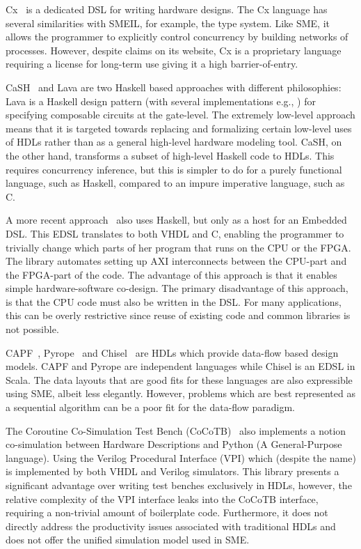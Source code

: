 Cx~\cite{cxlang} is a dedicated DSL for writing hardware designs. The Cx
language has several similarities with SMEIL, for example, the type system. Like
SME, it allows the programmer to explicitly control concurrency by building
networks of processes. However, despite claims on its website, Cx is a
proprietary language requiring a license for long-term use giving it a high
barrier-of-entry.

C\textlambda{}aSH~\cite{wester2015transformation} and Lava\cite{bjesse1998lava}
are two Haskell based approaches with different philosophies: Lava is a Haskell
design pattern (with several implementations e.g., \cite{gill2009introducing})
for specifying composable circuits at the gate-level. The extremely low-level
approach means that it is targeted towards replacing and formalizing certain
low-level uses of HDLs rather than as a general high-level hardware modeling
tool. C\textlambda{}aSH, on the other hand, transforms a subset of high-level
Haskell code to HDLs. This requires concurrency inference, but this is simpler
to do for a purely functional language, such as Haskell, compared to an impure
imperative language, such as C.

A more recent approach~\cite{aronsson2017hardware} also uses Haskell, but only
as a host for an Embedded DSL. This EDSL translates to both VHDL and C, enabling
the programmer to trivially change which parts of her program that runs on the
CPU or the FPGA. The library automates setting up AXI interconnects between the
CPU-part and the FPGA-part of the code. The advantage of this approach is that
it enables simple hardware-software co-design. The primary disadvantage of this
approach, is that the CPU code must also be written in the DSL. For many
applications, this can be overly restrictive since reuse of existing code and
common libraries is not possible.

CAPF~\cite{serot2011implementing}, Pyrope~\cite{pyrope} and
Chisel~\cite{bachrach2012chisel} are HDLs which provide data-flow based design
models. CAPF and Pyrope are independent languages while Chisel is an EDSL in
Scala. The data layouts that are good fits for these languages are also
expressible using SME, albeit less elegantly. However, problems which are best
represented as a sequential algorithm can be a poor fit for the data-flow
paradigm.

The Coroutine Co-Simulation Test Bench (CoCoTB)~\cite{cocotb} also implements a
notion co-simulation between Hardware Descriptions and Python (A General-Purpose
language). Using the Verilog Procedural Interface (VPI) which (despite the name)
is implemented by both VHDL and Verilog simulators. This library presents a
significant advantage over writing test benches exclusively in HDLs, however,
the relative complexity of the VPI interface leaks into the CoCoTB interface,
requiring a non-trivial amount of boilerplate code. Furthermore, it does not
directly address the productivity issues associated with traditional HDLs and
does not offer the unified simulation model used in SME.


